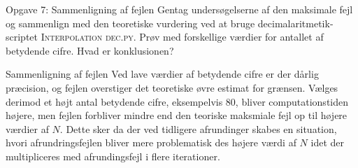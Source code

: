 \begin{frame}{Opgave 7: Sammenligning af fejlen}
    Gentag undersøgelserne af den maksimale fejl og sammenlign med den teoretiske vurdering ved at bruge decimalaritmetik-scriptet \textsc{Interpolation dec.py}. 
    Prøv med forskellige værdier for antallet af betydende cifre. 
    Hvad er konklusionen?
\end{frame}

\begin{frame}{Sammenligning af fejlen}
    Ved lave værdier af betydende cifre er der dårlig præcision, og fejlen overstiger det teoretiske øvre estimat for grænsen. 
    Vælges derimod et højt antal betydende cifre, eksempelvis $80$, bliver computationstiden højere, men fejlen forbliver mindre end den teoriske maksmiale fejl op til højere værdier af $N$.
    Dette sker da der ved tidligere afrundinger skabes en situation, hvori afrundringsfejlen bliver mere problematisk des højere værdi af $N$ idet der multipliceres med afrundingsfejl i flere iterationer.
\end{frame}